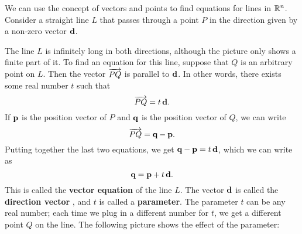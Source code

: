 We can use the concept of vectors and points to find equations for
lines in $\mathbb{R}^n$. Consider a straight line $L$ that passes through a
point $P$ in the direction given by a non-zero vector $\mbox{\bf d}$.
\begin{center}
\end{center}
The line $L$ is infinitely long in both directions, although the
picture only shows a finite part of it. To find an equation for this
line, suppose that $Q$ is an arbitrary point on $L$. Then the vector
$\overrightarrow{PQ}$ is parallel to $\mbox{\bf d}$. In other words, there
exists some real number $t$ such that
\begin{equation*}
  \overrightarrow{PQ} = t\,\mbox{\bf d}.
\end{equation*}
If $\mbox{\bf p}$ is the position vector of $P$ and $\mbox{\bf q}$ is the
position vector of $Q$, we can write
\begin{equation*}
  \overrightarrow{PQ} = \mbox{\bf q}-\mbox{\bf p}.
\end{equation*}
Putting together the last two equations, we get $\mbox{\bf q}-\mbox{\bf p} =
t\,\mbox{\bf d}$, which we can write as
\begin{equation*}
  \mbox{\bf q} = \mbox{\bf p} + t\,\mbox{\bf d}.
\end{equation*}
This is called the \textbf{vector equation}%
 of the
line $L$. The vector $\mbox{\bf d}$ is called the \textbf{direction
  vector}%
, and $t$ is
called a \textbf{parameter}. The parameter $t$ can be
any real number; each time we plug in a different number for $t$, we
get a different point $Q$ on the line. The following picture shows the
effect of the parameter:
